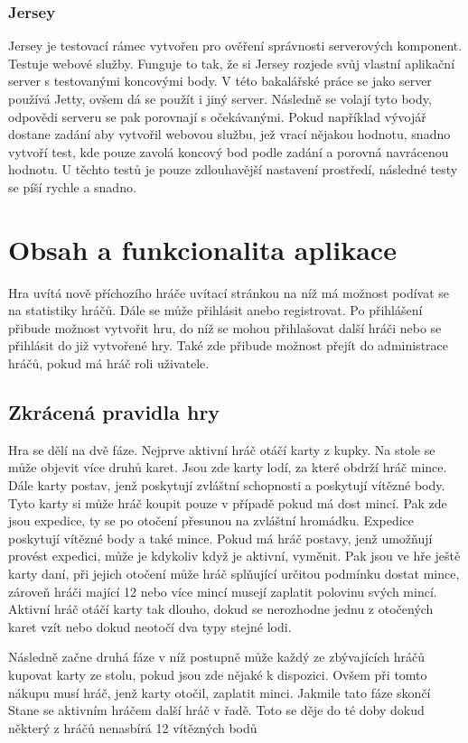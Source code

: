 \documentclass[czech,master,public,dept460,male,cpdeclaration,twoside]{diploma}
\begin{document}
\subsubsection{Jersey}
Jersey je testovací rámec vytvořen pro ověření správnosti serverových komponent. Testuje webové služby. Funguje to tak, že si Jersey rozjede svůj vlastní aplikační server s testovanými koncovými body. V této bakalářské práce se jako server používá Jetty, ovšem dá se použít i jiný server. Následně se volají tyto body, odpovědi serveru se pak porovnají s očekávanými. Pokud například vývojář dostane zadání aby vytvořil webovou službu, jež vrací nějakou hodnotu, snadno vytvoří test, kde pouze zavolá koncový bod podle zadání a porovná navrácenou hodnotu. U těchto testů je pouze zdlouhavější nastavení prostředí, následné testy se píší rychle a snadno.

\section{Obsah a funkcionalita aplikace}
Hra uvítá nově příchozího hráče uvítací stránkou na níž má možnost podívat se na statistiky hráčů. Dále se může přihlásit anebo registrovat. Po přihlášení přibude možnost vytvořit hru, do níž se mohou přihlašovat další hráči nebo se přihlásit do již vytvořené hry. Také zde přibude možnost přejít do administrace hráčů, pokud má hráč roli uživatele.

\subsection{Zkrácená pravidla hry}
Hra se dělí na dvě fáze. Nejprve aktivní hráč otáčí karty z kupky. Na stole se může objevit více druhů karet. Jsou zde karty lodí, za které obdrží hráč mince. Dále karty postav, jenž poskytují zvláštní schopnosti a poskytují vítězné body. Tyto karty si může hráč koupit pouze v případě pokud má dost mincí. Pak zde jsou expedice, ty se po otočení přesunou na zvláštní hromádku. Expedice poskytují vítězné body a také mince. Pokud má hráč postavy, jenž umožňují provést expedici, může je kdykoliv když je aktivní, vyměnit. Pak jsou ve hře ještě karty daní, při jejich otočení může hráč splňující určitou podmínku dostat mince, zároveň hráči mající 12 nebo více mincí musejí zaplatit polovinu svých mincí. Aktivní hráč otáčí karty tak dlouho, dokud se nerozhodne jednu z otočených karet vzít nebo dokud neotočí dva typy stejné lodi.

Následně začne druhá fáze v níž postupně může každý ze zbývajících hráčů kupovat karty ze stolu, pokud jsou zde nějaké k dispozici. Ovšem při tomto nákupu musí hráč, jenž karty otočil, zaplatit minci. Jakmile tato fáze skončí Stane se aktivním hráčem další hráč v řadě. Toto se děje do té doby dokud některý z hráčů nenasbírá 12 vítězných bodů
\end{document}

